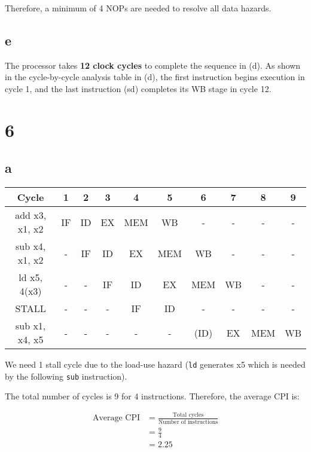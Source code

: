 \documentclass[12pt]{article}
\begin{document}
Therefore, a minimum of 4 NOPs are needed to resolve all data hazards.

\subsection*{e}
The processor takes \textbf{12 clock cycles} to complete the sequence in (d). As shown in the cycle-by-cycle analysis table in (d), the first instruction begins execution in cycle 1, and the last instruction (sd) completes its WB stage in cycle 12.

\section*{6}

\subsection*{a}

\begin{table}[h!]
    \centering
    \begin{tabular}{|c|c|c|c|c|c|c|c|c|c|}
    \hline
    Cycle             & 1  & 2  & 3  & 4   & 5   & 6    & 7   & 8   & 9   \\
    \hline
    add x3, x1, x2    & IF & ID & EX & MEM & WB  & -    & -   & -   & -   \\
    sub x4, x1, x2    & -  & IF & ID & EX  & MEM & WB   & -   & -   & -   \\
    ld x5, 4(x3)      & -  & -  & IF & ID  & EX  & MEM  & WB  & -   & -   \\
    STALL             & -  & -  & -  & IF  & ID  & -    & -   & -   & -   \\
    sub x1, x4, x5    & -  & -  & -  & -   & -   & (ID) & EX  & MEM & WB  \\
    \hline
    \end{tabular}
\end{table}

We need 1 stall cycle due to the load-use hazard (\texttt{ld} generates x5 which is needed by the following \texttt{sub} instruction).

The total number of cycles is 9 for 4 instructions. Therefore, the average CPI is:

\begin{align*}
\text{Average CPI} &= \frac{\text{Total cycles}}{\text{Number of instructions}} \\
&= \frac{9}{4} \\
&= 2.25
\end{align*}
\end{document}
